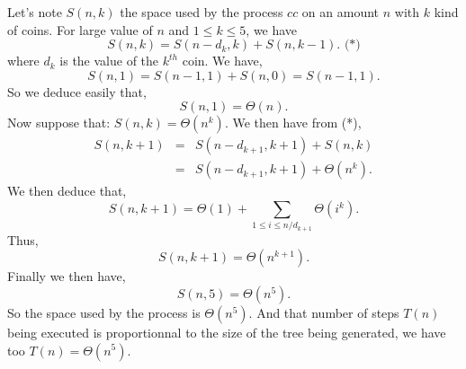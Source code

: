 \documentclass[a4paper,12pt]{article}
\begin{document}
Let's note $S(n, k)$ the space used by the process $cc$ on an amount
$n$ with $k$ kind of coins.  For large value of $n$ and $1 \le k\le
5$, we have
\[ S(n, k) = S(n - d_k, k) + S(n, k-1).\mbox{ (*)}\]
where $d_k$ is the value of the $k^{th}$ coin.  We have,
\[ S(n, 1) = S(n - 1, 1) + S(n, 0) = S(n-1, 1).\]
So we deduce easily that,
\[ S(n, 1) = \Theta(n).\]
Now suppose that: $S(n, k) = \Theta(n^k)$.
We then have from (*),
\begin{eqnarray*}
S(n, k+1) &=& S(n-d_{k+1}, k+1) + S(n, k) \\ 
	&=& S(n-d_{k+1}, k+1) + \Theta(n^k).
\end{eqnarray*}
We then deduce that,
\[ S(n, k+1) = \Theta(1) + \sum_{1 \le i \le n/d_{k+1}}
\Theta(i^k).\]
Thus,
\[ S(n, k+1) = \Theta(n^{k+1}).\]
Finally we then have,
\[ S(n, 5) = \Theta(n^5).\]
So the space used by the process is $\Theta(n^5)$.  And that number of
steps $T(n)$ being executed is proportionnal to the size of the tree being
generated, we have too $T(n) = \Theta(n^5)$.
\end{document}

